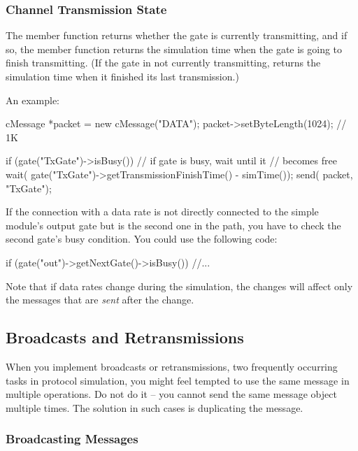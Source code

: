 \subsubsection{Channel Transmission State}
\label{sec:simple-modules:cgate-transmission-state}

The  member function returns whether the gate
is currently transmitting, and if so, the
 member function
returns the simulation time when the gate is going to finish
transmitting. (If the gate in not currently transmitting,
 returns the simulation time
when it finished its last transmission.)

An example:

\begin{cpp}
cMessage *packet = new cMessage("DATA");
packet->setByteLength(1024);  // 1K

if (gate("TxGate")->isBusy()) // if gate is busy, wait until it
{                             // becomes free
  wait( gate("TxGate")->getTransmissionFinishTime() - simTime());
}
send( packet, "TxGate");
\end{cpp}

If the connection with a data rate is not directly connected
to the simple module's output gate but is the second
one in the path, you have to check the second gate's busy
condition. You could use the following
code:

\begin{cpp}
if (gate("out")->getNextGate()->isBusy())
  //...
\end{cpp}

Note that if data rates change during the
simulation, the changes will affect only the messages that are
\textit{sent} after the change.



\subsection{Broadcasts and Retransmissions}

When you implement broadcasts or retransmissions, two frequently
occurring tasks in protocol simulation, you might feel tempted
to use the same message in multiple  operations.
Do not do it -- you cannot send the same message object multiple times.
The solution in such cases is duplicating the message.

\subsubsection{Broadcasting Messages}

